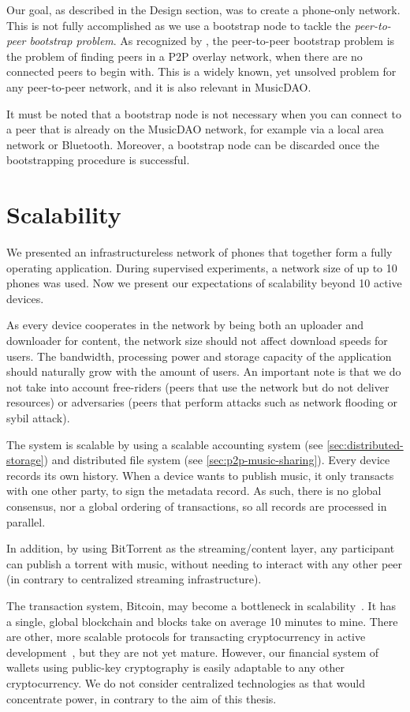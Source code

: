 Our goal, as described in the Design section, was to create a phone-only network. This is not fully accomplished as we use a bootstrap node to tackle the \textit{peer-to-peer bootstrap problem}. As recognized by \cite{wolinsky2010addressing}, the peer-to-peer bootstrap problem is the problem of finding peers in a P2P overlay network, when there are no connected peers to begin with. This is a widely known, yet unsolved problem for any peer-to-peer network, and it is also relevant in MusicDAO. 

It must be noted that a bootstrap node is not necessary when you can connect to a peer that is already on the MusicDAO network, for example via a local area network or Bluetooth. Moreover, a bootstrap node can be discarded once the bootstrapping procedure is successful.


\section{Scalability}
We presented an infrastructureless network of phones that together form a fully operating application. During supervised experiments, a network size of up to 10 phones was used. Now we present our expectations of scalability beyond 10 active devices. 

As every device cooperates in the network by being both an uploader and downloader for content, the network size should not affect download speeds for users. The bandwidth, processing power and storage capacity of the application should naturally grow with the amount of users. An important note is that we do not take into account free-riders (peers that use the network but do not deliver resources) or adversaries (peers that perform attacks such as network flooding or sybil attack).

The system is scalable by using a scalable accounting system (see \ref{sec:distributed-storage}) and distributed file system (see \ref{sec:p2p-music-sharing}). Every device records its own history. When a device wants to publish music, it only transacts with one other party, to sign the metadata record. As such, there is no global consensus, nor a global ordering of transactions, so all records are processed in parallel.

In addition, by using BitTorrent as the streaming/content layer, any participant can publish a torrent with music, without needing to interact with any other peer (in contrary to centralized streaming infrastructure). 

The transaction system, Bitcoin, may become a bottleneck in scalability~\citep{chauhan2018blockchain}. It has a single, global blockchain and blocks take on average 10 minutes to mine. There are other, more scalable protocols for transacting cryptocurrency in active development~\citep{lemahieu2018nano}, but they are not yet mature. However, our financial system of wallets using public-key cryptography is easily adaptable to any other cryptocurrency. We do not consider centralized technologies as that would concentrate power, in contrary to the aim of this thesis.

